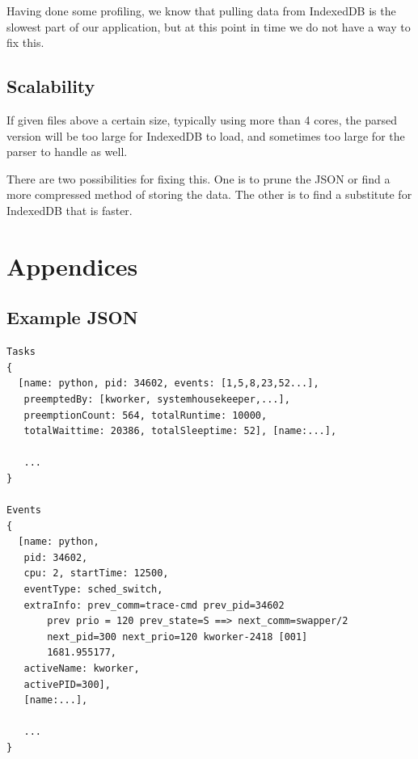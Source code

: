 \documentclass{hmcclinic}
\begin{document}
Having done some profiling, we know that pulling data from IndexedDB is the
slowest part of our application, but at this point in time we do not have a way
to fix this.

\section{Scalability}
If given files above a certain size, typically using more than 4
cores, the parsed version will be too large for IndexedDB to load, and
sometimes too large for the parser to handle as well.

There are two possibilities for fixing this. One is to prune the JSON or
find a more compressed method of storing the data. The other is to find a
substitute for IndexedDB that is faster.


\chapter{Appendices}
\newpage
\appendix
\renewcommand{\thesection}{\Alph{section}}
\section{Example JSON} \label{App:AppendixA}

\begin{verbatim}
Tasks
{
  [name: python, pid: 34602, events: [1,5,8,23,52...], 
   preemptedBy: [kworker, systemhousekeeper,...], 
   preemptionCount: 564, totalRuntime: 10000,
   totalWaittime: 20386, totalSleeptime: 52], [name:...],

   ...   
}

Events
{
  [name: python, 
   pid: 34602, 
   cpu: 2, startTime: 12500, 
   eventType: sched_switch,
   extraInfo: prev_comm=trace-cmd prev_pid=34602 
       prev prio = 120 prev_state=S ==> next_comm=swapper/2 
       next_pid=300 next_prio=120 kworker-2418 [001]
       1681.955177, 
   activeName: kworker, 
   activePID=300], 
   [name:...], 

   ...
}
\end{verbatim}
\newpage

\newpage
\end{document}
